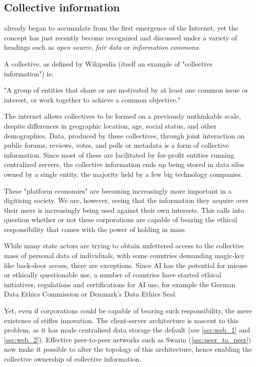 \subsection{Collective information \statusgreen}\label{sec:collective_information}

 already began to accumulate from the first emergence of the Internet, yet the concept has just recently become recognized and discussed under a variety of headings such as  \emph{open source}, \emph{fair data} or \emph{information commons}.

A collective, as defined by Wikipedia (itself an example of "collective information") is:
\begin{displayquote}
"A group of entities that share or are motivated by at least one common issue or interest, or work together to achieve a common objective." 
\end{displayquote}
The internet allows collectives to be formed on a previously unthinkable scale, despite differences in geographic location, age, social status, and other demographics. Data,  produced by these collectives, through joint interaction on public forums, reviews, votes, and polls or metadata is a form of collective information. Since most of these are facilitated by for-profit entities running centralized servers, the collective information ends up being stored in data silos owned by a single entity, the majority held by a few big technology companies.

These "platform economies" are becoming increasingly more important in a digitising society. We are, however, seeing that the information they acquire over their users is increasingly being used against their own interests. This calls into question whether or not these corporations are capable of bearing the ethical responsibility that comes with the power of holding  in mass.

While many state actors are trying to obtain unfettered access to the collective mass of personal data of individuals, with some countries demanding magic-key like back-door access, there are exceptions. Since AI has the potential for misuse or ethically questionable use, a number of countries have started ethical initiatives, regulations and certifications for AI use, for example the German Data Ethics Commission or Denmark's Data Ethics Seal. 

Yet, even if corporations could be capable of bearing such responsibility, the mere existence of  stifles innovation. The client-server architecture is nascent to this problem, as it has made centralised data storage the default (see \ref{sec:web_1} and \ref{sec:web_2}). Effective peer-to-peer networks such as Swarm (\ref{sec:peer_to_peer}) now make it possible to alter the topology of this architecture, hence enabling the collective ownership of collective information. 


